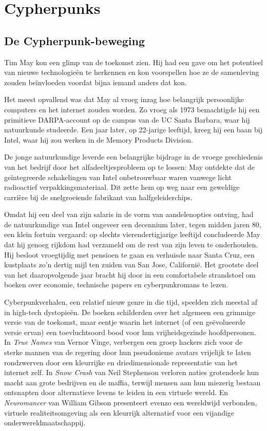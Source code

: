 \documentclass[
  a5paper,
  smalldemyvopaper,11pt,twoside,onecolumn,openright,extrafontsizes,
hidelinks]{memoir}
\begin{document}
\part{Cypherpunks}

\chapter{De Cypherpunk-beweging}\label{de-cypherpunk-beweging}

Tim May kon een glimp van de toekomst zien. Hij had een gave om het
potentieel van nieuwe technologieën te herkennen en kon voorspellen hoe
ze de samenleving zouden beïnvloeden voordat bijna iemand anders dat
kon.

Het meest opvallend was dat May al vroeg inzag hoe belangrijk
persoonlijke computers en het internet zouden worden. Zo vroeg als 1973
bemachtigde hij een primitieve DARPA-account op de campus van de UC
Santa Barbara, waar hij natuurkunde studeerde. Een jaar later, op
22-jarige leeftijd, kreeg hij een baan bij Intel, waar hij zou werken in
de Memory Products Division.

De jonge natuurkundige leverde een belangrijke bijdrage in de vroege
geschiedenis van het bedrijf door het alfadeeltjesprobleem op te lossen:
May ontdekte dat de geïntegreerde schakelingen van Intel onbetrouwbaar
waren vanwege licht radioactief verpakkingsmateriaal. Dit zette hem op
weg naar een geweldige carrière bij de snelgroeiende fabrikant van
halfgeleiderchips.

Omdat hij een deel van zijn salaris in de vorm van aandelenopties
ontving, had de natuurkundige van Intel ongeveer een decennium later,
tegen midden jaren 80, een klein fortuin vergaard: op slechts
vierendertigjarige leeftijd concludeerde May dat hij genoeg rijkdom had
verzameld om de rest van zijn leven te onderhouden. Hij besloot
vroegtijdig met pensioen te gaan en verhuisde naar Santa Cruz, een
kustplaats zo'n dertig mijl ten zuiden van San Jose, Californië. Het
grootste deel van het daaropvolgende jaar bracht hij door in een
comfortabele strandstoel om boeken over economie, technische papers en
cyberpunkromans te lezen.

Cyberpunkverhalen, een relatief nieuw genre in die tijd, speelden zich
meestal af in high-tech dystopieën. De boeken schilderden over het
algemeen een grimmige versie van de toekomst, maar eentje waarin het
internet (of een geëvolueerde versie ervan) een toevluchtsoord bood voor
hun vrijheidsgezinde hoofdpersonen. In \emph{True Names} van Vernor
Vinge, verbergen een groep hackers zich voor de sterke mannen van de
regering door hun pseudonieme avatars vrijelijk te laten rondzwerven
door een kleurrijke en driedimensionale representatie van het internet
zelf. In \emph{Snow Crash} van Neil Stephenson verloren naties
grotendeels hun macht aan grote bedrijven en de maffia, terwijl mensen
aan hun miezerig bestaan ontsnapten door alternatieve levens te leiden
in een virtuele wereld. En \emph{Neuromancer} van William Gibson
presenteert evenzo een wereldwijd verbonden, virtuele realiteitsomgeving
als een kleurrijk alternatief voor een vijandige
onderwereldmaatschappij.
\end{document}
